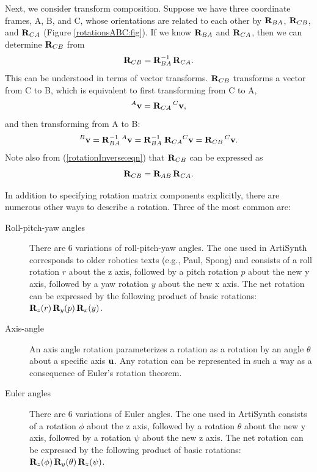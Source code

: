 Next, we consider transform composition. Suppose we have three
coordinate frames, A, B, and C, whose orientations are related to each other by
${\bf R}_{BA}$, ${\bf R}_{CB}$, and ${\bf R}_{CA}$ (Figure
\ref{rotationsABC:fig}).  If we know ${\bf R}_{BA}$ and ${\bf R}_{CA}$,
then we can determine ${\bf R}_{CB}$ from
%
\begin{equation}
{\bf R}_{CB} = {\bf R}_{BA}^{-1} \, {\bf R}_{CA}.
\label{rotationCB:eqn}
\end{equation}
%
This can be understood in terms of vector transforms. ${\bf R}_{CB}$
transforms a vector from C to B, which is equivalent to first
transforming from C to A,
%
\begin{equation}
{}^A{\bf v} = {\bf R}_{CA} \, {}^C{\bf v},
\end{equation}
%
and then transforming from A to B:
%
\begin{equation}
{}^B{\bf v} = {\bf R}_{BA}^{-1} \, {}^A{\bf v} = {\bf R}_{BA}^{-1} \; {\bf R}_{CA} {}^C{\bf v} = {\bf R}_{CB} \, {}^C{\bf v}.
\end{equation}
%
Note also from (\ref{rotationInverse:eqn}) that ${\bf R}_{CB}$ can be 
expressed as
%
\begin{equation}
{\bf R}_{CB} = {\bf R}_{AB} \, {\bf R}_{CA}.
\label{rotationCBII:eqn}
\end{equation}
%

In addition to specifying rotation matrix components explicitly,
there are numerous other ways to describe a rotation.
Three of the most common are:

\begin{description}

\item[Roll-pitch-yaw angles]\mbox{}

There are 6 variations of roll-pitch-yaw angles. The one used in
ArtiSynth corresponds to older robotics texts (e.g., Paul, Spong) and
consists of a roll rotation $r$ about the z axis, followed by a pitch
rotation $p$ about the new y axis, followed by a yaw rotation $y$
about the new x axis. The net rotation can be expressed by the
following product of basic rotations: ${\bf R}_z(r) \, {\bf R}_y(p) \, {\bf R}_x(y)$.

\item[Axis-angle]\mbox{}

An axis angle rotation parameterizes a rotation as a rotation by
an angle $\theta$ about a specific axis ${\bf u}$. Any rotation
can be represented in such a way as a consequence of Euler's rotation
theorem.

\item[Euler angles]\mbox{}

There are 6 variations of Euler angles. The one used in ArtiSynth
consists of a rotation $\phi$ about the z axis, followed by a rotation
$\theta$ about the new y axis, followed by a rotation $\psi$ about the
new z axis. The net rotation can be expressed by the following product
of basic rotations: ${\bf R}_z(\phi) \, {\bf R}_y(\theta) \, {\bf R}_z(\psi)$.

\end{description}

